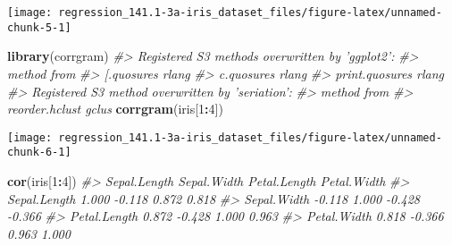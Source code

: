 \documentclass[]{book}
\newenvironment{Shaded}{\begin{snugshade}}{\end{snugshade}}
\newcommand{\CommentTok}[1]{\textcolor[rgb]{0.56,0.35,0.01}{\textit{#1}}}
\newcommand{\DataTypeTok}[1]{\textcolor[rgb]{0.13,0.29,0.53}{#1}}
\newcommand{\DecValTok}[1]{\textcolor[rgb]{0.00,0.00,0.81}{#1}}
\newcommand{\FloatTok}[1]{\textcolor[rgb]{0.00,0.00,0.81}{#1}}
\newcommand{\KeywordTok}[1]{\textcolor[rgb]{0.13,0.29,0.53}{\textbf{#1}}}
\newcommand{\NormalTok}[1]{#1}
\newcommand{\OperatorTok}[1]{\textcolor[rgb]{0.81,0.36,0.00}{\textbf{#1}}}
\begin{document}
\begin{center}\texttt{[image: regression\_141.1-3a-iris\_dataset\_files/figure-latex/unnamed-chunk-5-1]} \end{center}

\begin{Shaded}
\begin{Highlighting}[]
\KeywordTok{library}\NormalTok{(corrgram)}
\CommentTok{#> Registered S3 methods overwritten by 'ggplot2':}
\CommentTok{#>   method         from }
\CommentTok{#>   [.quosures     rlang}
\CommentTok{#>   c.quosures     rlang}
\CommentTok{#>   print.quosures rlang}
\CommentTok{#> Registered S3 method overwritten by 'seriation':}
\CommentTok{#>   method         from }
\CommentTok{#>   reorder.hclust gclus}
\KeywordTok{corrgram}\NormalTok{(iris[}\DecValTok{1}\OperatorTok{:}\DecValTok{4}\NormalTok{])}
\end{Highlighting}
\end{Shaded}

\begin{center}\texttt{[image: regression\_141.1-3a-iris\_dataset\_files/figure-latex/unnamed-chunk-6-1]} \end{center}

\begin{Shaded}
\begin{Highlighting}[]
\KeywordTok{cor}\NormalTok{(iris[}\DecValTok{1}\OperatorTok{:}\DecValTok{4}\NormalTok{])}
\CommentTok{#>              Sepal.Length Sepal.Width Petal.Length Petal.Width}
\CommentTok{#> Sepal.Length        1.000      -0.118        0.872       0.818}
\CommentTok{#> Sepal.Width        -0.118       1.000       -0.428      -0.366}
\CommentTok{#> Petal.Length        0.872      -0.428        1.000       0.963}
\CommentTok{#> Petal.Width         0.818      -0.366        0.963       1.000}
\end{Highlighting}
\end{Shaded}

\begin{Shaded}
\end{Shaded}

\begin{Shaded}
\end{Shaded}
\end{document}
